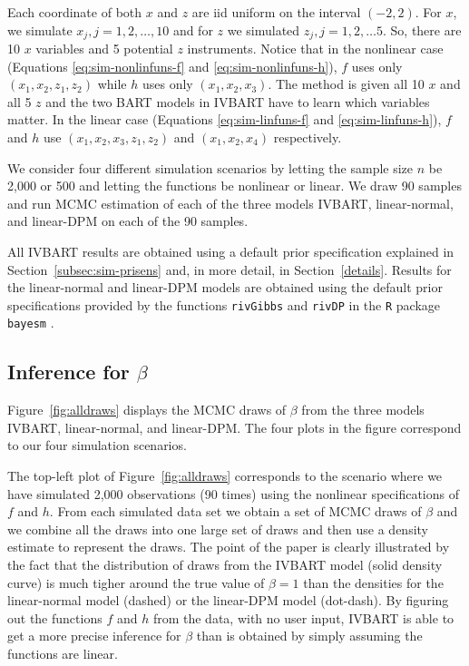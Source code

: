 Each coordinate of both $x$ and $z$ are iid uniform on the interval $(-2,2)$.
For $x$, we simulate $x_j, j=1,2,\ldots,10$ and for $z$ we simulated $z_j, j=1,2, \ldots 5$.
So, there are 10 $x$ variables and 5 potential $z$ instruments.
Notice that in the nonlinear case (Equations  \ref{eq:sim-nonlinfuns-f} and \ref{eq:sim-nonlinfuns-h}),
$f$ uses only $(x_1,x_2,z_1,z_2)$ while $h$ uses only $(x_1,x_2,x_3)$.
The method is given all 10 $x$ and all 5 $z$ and the two BART models in IVBART have to learn which variables matter.
In the linear case (Equations \ref{eq:sim-linfuns-f} and \ref{eq:sim-linfuns-h}),
$f$ and $h$ use $(x_1,x_2,x_3,z_1,z_2)$ and $(x_1,x_2,x_4)$ respectively.

We consider four different simulation scenarios by letting the sample
size $n$ be 2,000 or 500 and letting the functions be nonlinear or
linear.  We draw 90 samples and run MCMC estimation of each of the
three models IVBART, linear-normal, and linear-DPM on each of the 90
samples.

All IVBART results are obtained using a default prior specification
explained in Section~\ref{subsec:sim-prisens} and, in more detail, in
Section~\ref{details}.  Results for the linear-normal and linear-DPM
models are obtained using the default prior specifications provided by
the functions \texttt{rivGibbs} and \texttt{rivDP} in the \texttt{R}
package \texttt{bayesm} \citep{RPbayesm}.

\subsection{Inference for $\beta$}\label{subsec:sim-beta-inf}

Figure~\ref{fig:alldraws} displays the MCMC draws of $\beta$ from the three models
IVBART, linear-normal, and linear-DPM.
The four plots in the figure correspond to our four simulation scenarios.

The top-left plot of Figure~\ref{fig:alldraws}  corresponds to the scenario where we have simulated 2,000 observations (90 times) using
the nonlinear specifications of $f$ and $h$.
From each simulated data set we obtain a set of MCMC draws of $\beta$ and we combine all the draws into one large
set of draws and then use a density estimate to represent the draws.
The point of the paper is clearly illustrated by the  fact that the distribution of draws
from the IVBART model (solid density curve) is much tigher around the true value of $\beta=1$ than
the densities for the linear-normal model (dashed) or the linear-DPM model (dot-dash).
By figuring out the functions $f$ and $h$ from the data, with no user input, IVBART is able to get
a more precise inference for $\beta$ than is obtained by simply assuming the functions are linear.

